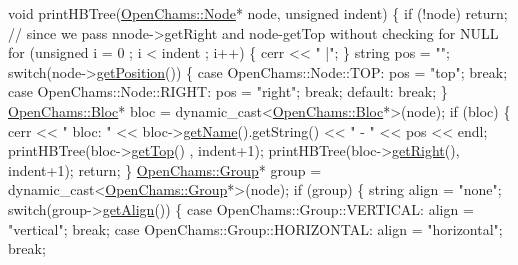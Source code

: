 \begin{DoxyCodeInclude}
\textcolor{keywordtype}{void} printHBTree(\hyperlink{class_open_chams_1_1_node}{OpenChams::Node}* node, \textcolor{keywordtype}{unsigned} indent) \{
    \textcolor{keywordflow}{if} (!node) \textcolor{keywordflow}{return}; \textcolor{comment}{// since we pass nnode->getRight and node-getTop without checking for NULL}
    \textcolor{keywordflow}{for} (\textcolor{keywordtype}{unsigned} i = 0 ; i < indent ; i++) \{
        cerr << \textcolor{stringliteral}{" |"};
    \}
    \textcolor{keywordtype}{string} pos = \textcolor{stringliteral}{""};
    \textcolor{keywordflow}{switch}(node->\hyperlink{class_open_chams_1_1_node_a2843ffc4a8a476bc6d96d9a155d3071e}{getPosition}()) \{
        \textcolor{keywordflow}{case} OpenChams::Node::TOP:
            pos = \textcolor{stringliteral}{"top"};
            \textcolor{keywordflow}{break};
        \textcolor{keywordflow}{case} OpenChams::Node::RIGHT:
            pos = \textcolor{stringliteral}{"right"};
            \textcolor{keywordflow}{break};
        \textcolor{keywordflow}{default}:
            \textcolor{keywordflow}{break};
    \}
    \hyperlink{class_open_chams_1_1_bloc}{OpenChams::Bloc}* bloc = \textcolor{keyword}{dynamic\_cast<}\hyperlink{class_open_chams_1_1_bloc}{OpenChams::Bloc}*\textcolor{keyword}{>}(node);
    \textcolor{keywordflow}{if} (bloc) \{
        cerr << \textcolor{stringliteral}{" bloc: "} << bloc->\hyperlink{class_open_chams_1_1_node_aef436e6e20d1dbf2eb78b089ca9d0794}{getName}().getString() << \textcolor{stringliteral}{" - "} << pos << endl;
        printHBTree(bloc->\hyperlink{class_open_chams_1_1_node_af59967a8c2d5a04ca0a58e2ef29bead1}{getTop}()  , indent+1);
        printHBTree(bloc->\hyperlink{class_open_chams_1_1_node_a9533ddcf078ddfc2a4e9bd9ffafa51cb}{getRight}(), indent+1);
        \textcolor{keywordflow}{return};
    \}
    \hyperlink{class_open_chams_1_1_group}{OpenChams::Group}* group = \textcolor{keyword}{dynamic\_cast<}\hyperlink{class_open_chams_1_1_group}{OpenChams::Group}*\textcolor{keyword}{>}(node);
    \textcolor{keywordflow}{if} (group) \{
        \textcolor{keywordtype}{string} align = \textcolor{stringliteral}{"none"};
        \textcolor{keywordflow}{switch}(group->\hyperlink{class_open_chams_1_1_group_a7cff0c4a6957f23fb1ea4598f4b8a0b8}{getAlign}()) \{
            \textcolor{keywordflow}{case} OpenChams::Group::VERTICAL:
                align = \textcolor{stringliteral}{"vertical"};
                \textcolor{keywordflow}{break};
            \textcolor{keywordflow}{case} OpenChams::Group::HORIZONTAL:
                align = \textcolor{stringliteral}{"horizontal"};
                \textcolor{keywordflow}{break};

\end{DoxyCodeInclude}
